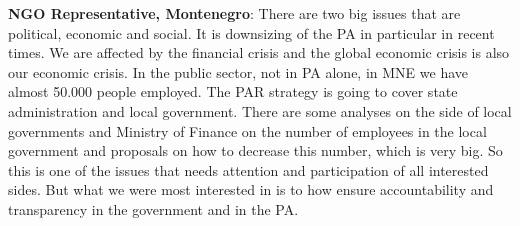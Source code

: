 \textbf{NGO Representative, Montenegro}: There are two big issues that are political, economic and social. It is downsizing of the PA in particular in recent times. We are affected by the financial crisis and the global economic crisis is also our economic crisis. In the public sector, not in PA alone, in MNE we have almost 50.000 people employed. The PAR strategy is going to cover state administration and local government. There are some analyses on the side of local governments and Ministry of Finance on the number of employees in the local government and proposals on how to decrease this number, which is very big. So this is one of the issues that needs attention and participation of all interested sides. But what we were most interested in is to how ensure accountability and transparency in the government and in the PA.%
